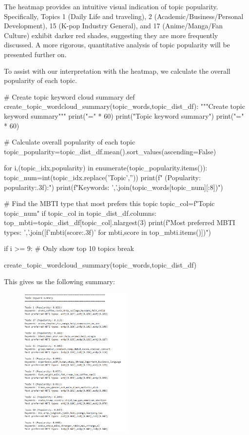 \documentclass[12pt]{article}
\numberwithin{figure}{section}  %
\begin{document}
	The heatmap provides an intuitive visual indication of topic popularity.
	Specifically, Topics 1 (Daily Life and traveling),
	2 (Academic/Business/Personal Development), 15 (K-pop Industry General), and
	17 (Anime/Manga/Fan Culture) exhibit darker red shades, suggesting they are
	more frequently discussed. A more rigorous, quantitative analysis of topic
	popularity will be presented further on.
	
	To assist with our interpretation with the heatmap, we calculate the overall
	popularity of each topic.
	\begin{python}
# Create topic keyword cloud summary
def create_topic_wordcloud_summary(topic_words,topic_dist_df):
    """Create topic keyword summary"""
    print("=" * 60)
    print("Topic keyword summary")
    print("=" * 60)
    
    # Calculate overall popularity of each topic
    topic_popularity=topic_dist_df.mean().sort_values(ascending=False)
    
    for i,(topic_idx,popularity) in enumerate(topic_popularity.items()):
        topic_num=int(topic_idx.replace('Topic',''))
        print(f" (Popularity: {popularity:.3f}):")
        print(f"Keywords: {','.join(topic_words[topic_num][:8])}")
        
        # Find the MBTI type that most prefers this topic
        topic_col=f"Topic {topic_num}"
        if topic_col in topic_dist_df.columns:
            top_mbti=topic_dist_df[topic_col].nlargest(3)
            print(f"Most preferred MBTI types: {','.join([f'{mbti}({score:.3f})' for mbti,score in top_mbti.items()])}")
        
        if i >= 9:  # Only show top 10 topics
            break


create_topic_wordcloud_summary(topic_words,topic_dist_df)
	\end{python}
	 This gives us the following summary:
	 \begin{figure}[H]
	 		\centering
	 		\includegraphics[width=0.5\textwidth]{Q2topsum} 	
	 \end{figure}
	 
\end{document}
